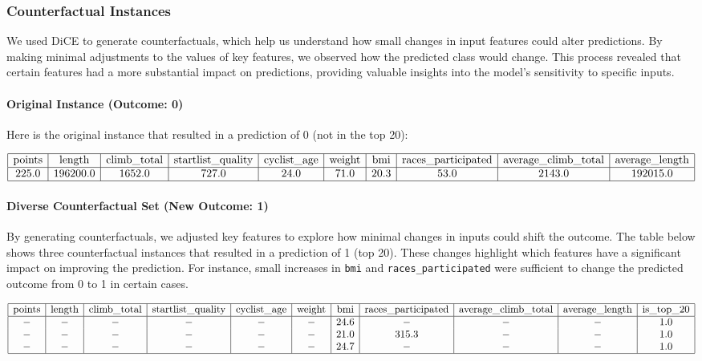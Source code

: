 \documentclass{article}
\begin{document}
\subsubsection{Counterfactual Instances}

We used DiCE to generate counterfactuals, which help us understand how small changes in input features could alter predictions. By making minimal adjustments to the values of key features, we observed how the predicted class would change. This process revealed that certain features had a more substantial impact on predictions, providing valuable insights into the model's sensitivity to specific inputs.

\paragraph{Original Instance (Outcome: 0)} Here is the original instance that resulted in a prediction of 0 (not in the top 20):

\[
\begin{array}{|c|c|c|c|c|c|c|c|c|c|c|}
\hline
\text{points} & \text{length} & \text{climb\_total} & \text{startlist\_quality} & \text{cyclist\_age} & \text{weight} & \text{bmi} & \text{races\_participated} & \text{average\_climb\_total} & \text{average\_length} \\
\hline
225.0 & 196200.0 & 1652.0 & 727.0 & 24.0 & 71.0 & 20.3 & 53.0 & 2143.0 & 192015.0 \\
\hline
\end{array}
\]

\paragraph{Diverse Counterfactual Set (New Outcome: 1)} By generating counterfactuals, we adjusted key features to explore how minimal changes in inputs could shift the outcome. The table below shows three counterfactual instances that resulted in a prediction of 1 (top 20). These changes highlight which features have a significant impact on improving the prediction. For instance, small increases in \texttt{bmi} and \texttt{races\_participated} were sufficient to change the predicted outcome from 0 to 1 in certain cases.

\[
\begin{array}{|c|c|c|c|c|c|c|c|c|c|c|}
\hline
\text{points} & \text{length} & \text{climb\_total} & \text{startlist\_quality} & \text{cyclist\_age} & \text{weight} & \text{bmi} & \text{races\_participated} & \text{average\_climb\_total} & \text{average\_length} & \text{is\_top\_20} \\
\hline
- & - & - & - & - & - & 24.6 & - & - & - & 1.0 \\
- & - & - & - & - & - & 21.0 & 315.3 & - & - & 1.0 \\
- & - & - & - & - & - & 24.7 & - & - & - & 1.0 \\
\hline
\end{array}
\]
\end{document}
